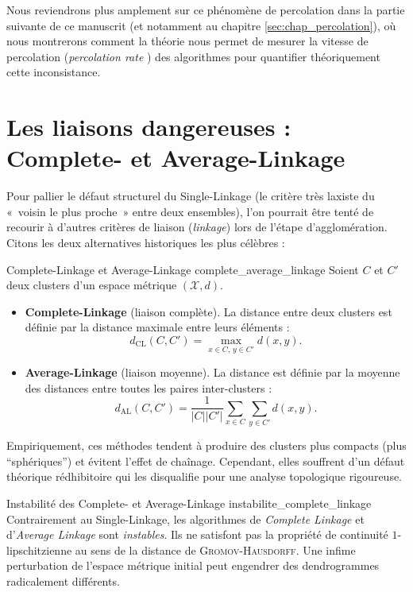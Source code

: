 Nous reviendrons plus amplement sur ce phénomène de percolation dans la partie suivante de ce manuscrit (et notamment au chapitre \ref{sec:chap_percolation}), où nous montrerons comment la théorie nous permet de mesurer la vitesse de percolation (\emph{percolation rate} \cite{BibiVenise, BibiIstambul}) des algorithmes pour quantifier théoriquement cette inconsistance.


\section{Les liaisons dangereuses : Complete- et Average-Linkage}

Pour pallier le défaut structurel du Single-Linkage (le critère très laxiste du «~voisin le plus proche~» entre deux ensembles), l'on pourrait être tenté de recourir à d'autres critères de liaison (\emph{linkage}) lors de l'étape d'agglomération. Citons les deux alternatives historiques les plus célèbres :

\begin{Definition}{Complete-Linkage \cite{Sorensen1948} et Average-Linkage \cite{SokalMichener1958}}{complete_average_linkage}
Soient $C$ et $C'$ deux clusters d'un espace métrique $(\mathcal X, d)$.
\begin{itemize}
    \item \textbf{Complete-Linkage} (liaison complète). La distance entre deux clusters est définie par la distance maximale entre leurs éléments :
    \[
    \boxed{
        d_{\mathrm{CL}}(C, C') = \max_{x \in C, \, y \in C'} d(x,y).
        }
    \]
    \item \textbf{Average-Linkage} (liaison moyenne). La distance est définie par la moyenne des distances entre toutes les paires inter-clusters :
    \[
    \boxed{
        d_{\mathrm{AL}}(C, C') = \frac{1}{|C| |C'|} \sum_{x \in C} \sum_{y \in C'} d(x,y).
        }
    \]
\end{itemize}
\end{Definition}

Empiriquement, ces méthodes tendent à produire des clusters plus compacts (plus ``sphériques'') et évitent l'effet de chaînage. Cependant, elles souffrent d'un défaut théorique rédhibitoire qui les disqualifie pour une analyse topologique rigoureuse.

\begin{Resultat}{Instabilité des Complete- et Average-Linkage \cite{CarlssonMemoli2010}}{instabilite_complete_linkage}
Contrairement au Single-Linkage, les algorithmes de \emph{Complete Linkage} et d'\emph{Average Linkage} sont \emph{instables}. Ils ne satisfont pas la propriété de continuité $1$-lipschitzienne au sens de la distance de \textsc{Gromov-Hausdorff}. Une infime perturbation de l'espace métrique initial peut engendrer des dendrogrammes radicalement différents.
\end{Resultat}

